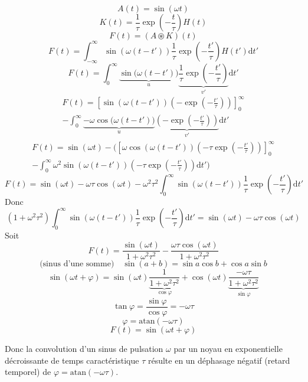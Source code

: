 $$ A(t) = \sin(\omega t) $$
$$ K(t) = \frac{1}{\tau}\exp\left(-\frac{t}{\tau}\right)H(t) $$
$$ F(t) = (A\circledast K)(t) $$ 
$$
F(t) = \int_{-\infty}^\infty\sin(\omega(t-t'))\frac{1}{\tau}\exp\left(-\frac{t'}{\tau}\right)H(t')\mathrm{d}t'
$$
$$
F(t) = \int_{0}^\infty\underbrace{\sin\bigg(\omega(t-t')\bigg)}_u\underbrace{\frac{1}{\tau}\exp\left(-\frac{t'}{\tau}\right)}_{v'}\mathrm{d}t'
$$
\begin{multline}
F(t) = \left[\sin(\omega(t-t'))\left(-\exp\left(-\frac{t'}{\tau}\right)\right)\right]_0^\infty \\ -
\int_{0}^\infty\underbrace{-\omega\cos\bigg(\omega(t-t')\bigg)}_u\underbrace{\left(-\exp\left(-\frac{t'}{\tau}\right)\right)}_{v'}\mathrm{d}t'
\end{multline}
\begin{multline}
F(t) = \sin(\omega t) -
\Bigg(\left[\omega\cos(\omega(t-t'))\left(-\tau\exp\left(-\frac{t'}{\tau}\right)\right)\right]_0^\infty \\ -
\int_0^\infty\omega^2\sin(\omega(t-t'))\left(-\tau\exp\left(-\frac{t'}{\tau}\right)\right)\mathrm{d}t' \Bigg)
\end{multline}
$$
F(t) = \sin(\omega t) - \omega\tau\cos(\omega t) - \omega^2\tau^2\int_0^\infty\sin(\omega(t-t')) \frac{1}{\tau}\exp\left(-\frac{t'}{\tau}\right)\mathrm{d}t'
$$
Donc
$$
(1+\omega^2\tau^2)\int_0^\infty\sin(\omega(t-t')) \frac{1}{\tau}\exp\left(-\frac{t'}{\tau}\right)\mathrm{d}t' = \sin(\omega t) - \omega\tau\cos(\omega t)
$$
Soit
$$
F(t) = \frac{\sin(\omega t)}{1+\omega^2\tau^2} - \frac{\omega\tau\cos(\omega t)}{1+\omega^2\tau^2}
$$
$$ \text{(sinus d'une somme)}  \quad  \sin(a+b) = \sin a\cos b + \cos a\sin b $$
$$
\sin(\omega t+\varphi) = \sin(\omega t)\underbrace{\frac{1}{1+\omega^2\tau^2}}_{\cos\varphi} + \cos(\omega t)\underbrace{\frac{-\omega\tau}{1+\omega^2\tau^2}}_{\sin\varphi}
$$
$$ \tan\varphi = \frac{\sin\varphi}{\cos\varphi} = -\omega\tau $$
$$ \varphi = \mathrm{atan}(-\omega\tau) $$
$$ F(t) = \sin(\omega t + \varphi) $$

Donc la convolution d'un sinus de pulsation $\omega$ par un noyau en exponentielle décroissante de temps caractéristique $\tau$ résulte en un déphasage négatif (retard temporel) de $ \varphi = \mathrm{atan}(-\omega\tau) $.